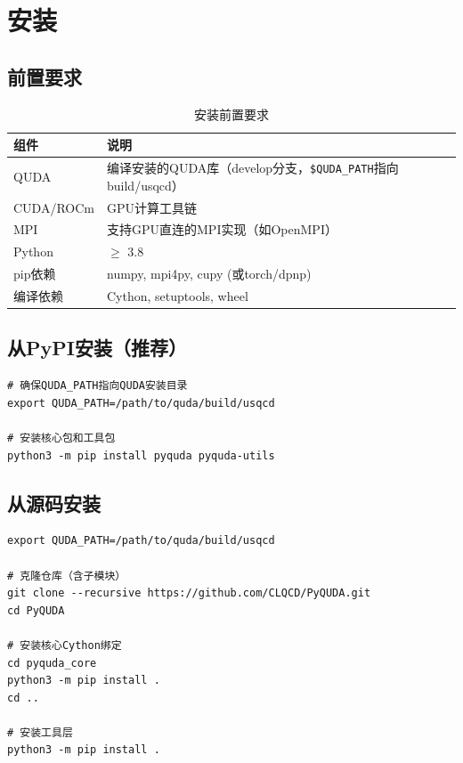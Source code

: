 \documentclass[12pt,a4paper]{ctexart}
\begin{document}
\section{安装}

\subsection{前置要求}

\begin{table}[H]
\centering
\caption{安装前置要求}
\label{tab:prerequisites}
\begin{tabular}{@{}ll@{}}
\toprule
\textbf{组件} & \textbf{说明} \\
\midrule
QUDA & 编译安装的QUDA库（develop分支，\texttt{\$QUDA\_PATH}指向build/usqcd） \\
CUDA/ROCm & GPU计算工具链 \\
MPI & 支持GPU直连的MPI实现（如OpenMPI） \\
Python & $\ge$ 3.8 \\
pip依赖 & numpy, mpi4py, cupy (或torch/dpnp) \\
编译依赖 & Cython, setuptools, wheel \\
\bottomrule
\end{tabular}
\end{table}

\subsection{从PyPI安装（推荐）}

\begin{lstlisting}[caption={从PyPI安装}, label={lst:pypi_install}]
# 确保QUDA_PATH指向QUDA安装目录
export QUDA_PATH=/path/to/quda/build/usqcd

# 安装核心包和工具包
python3 -m pip install pyquda pyquda-utils
\end{lstlisting}

\subsection{从源码安装}

\begin{lstlisting}[caption={从源码编译安装}, label={lst:source_install}]
export QUDA_PATH=/path/to/quda/build/usqcd

# 克隆仓库（含子模块）
git clone --recursive https://github.com/CLQCD/PyQUDA.git
cd PyQUDA

# 安装核心Cython绑定
cd pyquda_core
python3 -m pip install .
cd ..

# 安装工具层
python3 -m pip install .
\end{lstlisting}
\end{document}
